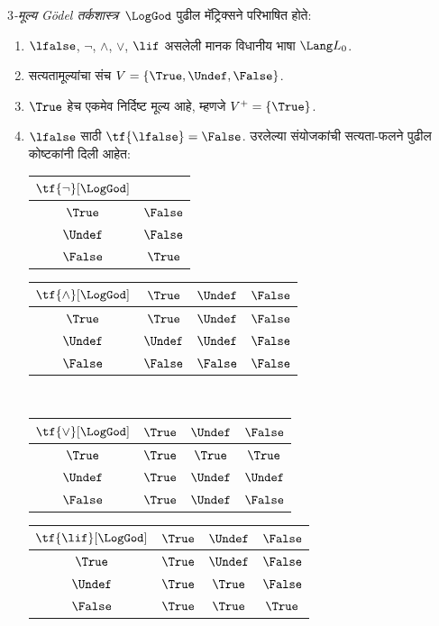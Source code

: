 \begin{defn}\label{mvl:thr:god:defn:goedel}
\emph{$3$-मूल्य G\"odel तर्कशास्त्र}~$\LogGod$ पुढील
मॅट्रिक्सने परिभाषित होते:
\begin{enumerate}
  \item $\lfalse$, $\lnot$, $\land$, $\lor$, $\lif$ असलेली मानक विधानीय भाषा $\Lang L_0$.
  \item सत्यतामूल्यांचा संच $V = \{\True, \Undef, \False\}$.
  \item $\True$ हेच एकमेव निर्दिष्ट मूल्य आहे, म्हणजे $V^+ = \{\True\}$.
  \item $\lfalse$ साठी $\tf{\lfalse} = \False$. उरलेल्या
  संयोजकांची सत्यता-फलने पुढील कोष्टकांनी दिली आहेत:
  \begin{center}
    \begin{tabular}{c|c}
      $\tf{\lnot}[\LogGod]$ & \\
      \hline
      $\True$ & $\False$ \\
      $\Undef$ & $\False$ \\
      $\False$ & $\True$
    \end{tabular}
    \quad
    \begin{tabular}{c|ccc}
      $\tf{\land}[\LogGod]$ & $\True$ & $\Undef$ & $\False$ \\
      \hline
      $\True$ & $\True$ & $\Undef$ & $\False$ \\
      $\Undef$ & $\Undef$ & $\Undef$ & $\False$\\
      $\False$ & $\False$ & $\False$ & $\False$
    \end{tabular}
    \\[2ex]
    \begin{tabular}{c|ccc}
      $\tf{\lor}[\LogGod]$ & $\True$ & $\Undef$ & $\False$ \\
      \hline
      $\True$ & $\True$ & $\True$ & $\True$ \\
      $\Undef$ & $\True$ & $\Undef$ & $\Undef$ \\
      $\False$ & $\True$ & $\Undef$ & $\False$
    \end{tabular}
    \quad
    \begin{tabular}{c|ccc}
      $\tf{\lif}[\LogGod]$ & $\True$ & $\Undef$ & $\False$ \\
      \hline
      $\True$ & $\True$ & $\Undef$ & $\False$ \\
      $\Undef$ & $\True$ & $\True$ & $\False$  \\
      $\False$ & $\True$ & $\True$ & $\True$
    \end{tabular}
  \end{center}
\end{enumerate}
\end{defn}
